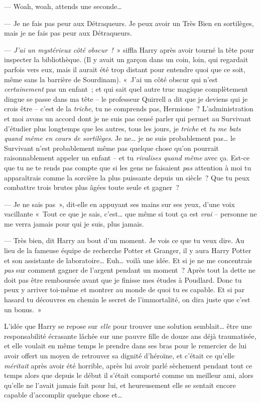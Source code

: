 --- Woah, woah, attends une seconde…

--- Je ne fais pas peur aux Détraqueurs.
Je peux avoir un Très Bien en sortilèges, mais je ne fais pas peur aux Détraqueurs.

--- \emph{J'ai un mystérieux côté obscur~!}~» siffla Harry après avoir tourné la tête pour inspecter la bibliothèque.
(Il y avait un garçon dans un coin, loin, qui regardait parfois vers eux, mais il aurait été trop distant pour entendre quoi que ce soit, même sans la barrière de Sourdinam).
«~J'ai un côté obscur qui n'est \emph{certainement} pas un enfant~; et qui sait quel autre truc magique complètement dingue se passe dans ma tête -- le professeur Quirrell a dit que je deviens qui je crois être -- c'est de la \emph{triche}, tu ne comprends pas, Hermione~?
L'administration et moi avons un accord dont je ne suis pas censé parler qui permet au Survivant d'étudier plus longtemps que les autres, tous les jours, je \emph{triche} et \emph{tu me bats quand même en cours de sortilèges}.
Je ne… je ne suis probablement pas… le Survivant n'est probablement même pas quelque chose qu'on pourrait raisonnablement appeler un enfant -- et tu \emph{rivalises quand même} avec ça.
Est-ce que tu ne te rends pas compte que si les gens ne faisaient \emph{pas} attention à moi tu apparaîtrais comme la sorcière la plus puissante depuis un siècle~?
Que tu peux combattre trois brutes plus âgées toute seule et gagner~?

--- Je ne sais pas~», dit-elle en appuyant ses mains sur ses yeux, d'une voix vacillante «~Tout ce que je sais, c'est… que même si tout ça est \emph{vrai} -- personne ne me verra jamais pour qui je suis, plus jamais.

--- Très bien, dit Harry au bout d'un moment.
Je vois ce que tu veux dire.
Au lieu de la fameuse équipe de recherche Potter et Granger, il y aura Harry Potter et son assistante de laboratoire…
Euh… voilà une idée.
Et si je ne me concentrais \emph{pas} sur comment gagner de l'argent pendant un moment~?
Après tout la dette ne doit pas être remboursée avant que je finisse mes études à Poudlard.
Donc tu peux y arriver toi-même et montrer au monde de quoi tu es capable.
Et si par hasard tu découvres en chemin le secret de l'immortalité, on dira juste que c'est un bonus.~»

L'idée que Harry se repose sur \emph{elle} pour trouver une solution semblait… être une responsabilité écrasante lâchée sur une pauvre fille de douze ans déjà traumatisée, et elle voulait en même temps le prendre dans ses bras pour le remercier de lui avoir offert un moyen de retrouver sa dignité d'héroïne, et c'était ce qu'elle \emph{méritait} après avoir été horrible, après lui avoir parlé sèchement pendant tout ce temps alors que depuis le début il s'était comporté comme un meilleur ami, alors qu'elle ne l'avait jamais fait pour lui, et heureusement elle se sentait encore capable d'accomplir quelque chose et…

